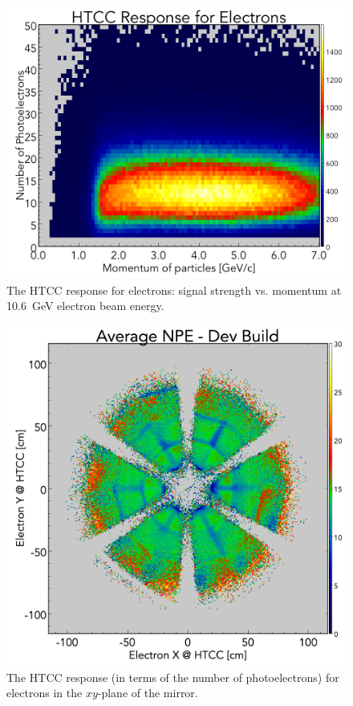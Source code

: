 \begin{figure}[!ht]
    \centering
    \includegraphics[width=1.0\linewidth,trim={0.0cm 0.0cm 0.0cm 1.73cm},clip]{images/HTCC_Response_run4013.png}
    \caption{The HTCC response for electrons: signal strength vs. momentum at 10.6~GeV electron beam energy.}
    \label{fig:HTCC_Response_run4013}
\end{figure}

\begin{figure}[!ht]
    \centering
    \includegraphics[width=1.0\linewidth,trim={0.0cm 0.0cm 0.0cm 1.67cm},clip]{images/avgNPE_Theta_Phi_Dev_Build-2_NO_HOLES.png}
    \caption{The HTCC response (in terms of the number of photoelectrons) for electrons in the $xy$-plane of the
      mirror.}
    \label{fig:avgNPE_Theta_Phi_Dev_Build-2_NO_HOLES}
\end{figure}

